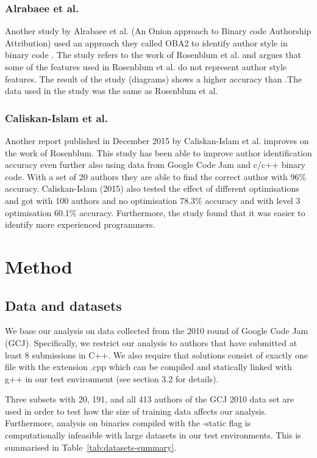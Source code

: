 \documentclass[a4paper,11pt]{kth-mag}
\begin{document}
\subsection{Alrabaee et al.}
Another study by Alrabaee et al. (An Onion approach to Binary code Authorship
Attribution) used an approach they called OBA2 to identify author style in
binary code \parencite{alrabaee2014oba2}. The study refers to the work of
Rosenblum et al. and argues that some of the features used in Rosenblum et al.
do not represent author style features. The result of the study (diagrams)
shows a higher accuracy than \parencite{rosenblum2011wrote}.The data used in
the study was the same as Rosenblum et al. 

\subsection{Caliskan-Islam et al.}
Another report published in December 2015 by Caliskan-Islam et al. improves on
the work of Rosenblum. This study has been able to improve author
identification accuracy even further also using data from Google Code Jam and
c/c++ binary code. With a set of 20 authors they are able to find the correct
author with 96\% accuracy. Caliskan-Islam (2015) also tested the effect of
different optimisations and got with 100 authors and no optimisation 78.3\%
accuracy and with level 3 optimisation 60.1\% accuracy. Furthermore, the study
found that it was easier to identify more experienced programmers.

\chapter{Method}
\section{Data and datasets}
We base our analysis on data collected from the 2010 round of Google Code Jam
(GCJ). Specifically, we restrict our analysis to authors that have submitted at
least 8 submissions in C++. We also require that solutions consist of exactly
one file with the extension .cpp which can be compiled and statically linked
with g++ in our test environment (see section 3.2 for details).

Three subsets with 20, 191, and all 413 authors of the GCJ 2010 data set are
used in order to test how the size of training data affects our analysis.
Furthermore, analysis on binaries compiled with the -static flag is
computationally infeasible with large datasets in our test environments. This
is summarised in Table~\ref{tab:datasets-summary}.
\end{document}
